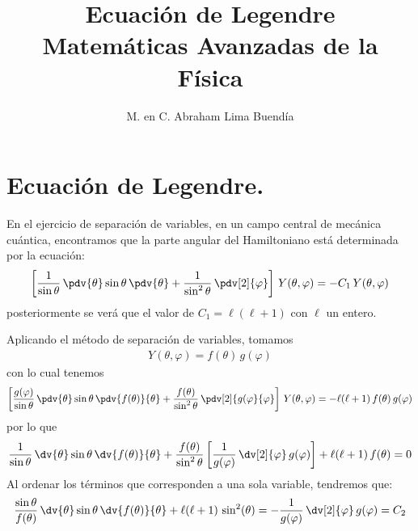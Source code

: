 
\title{Ecuación de Legendre\\ \large{Matemáticas Avanzadas de la Física}\vspace{-3ex}}
\author{M. en C. Abraham Lima Buendía}
\date{ }

\vspace{-4cm}
\maketitle
\fontsize{14}{14}\selectfont
\section{Ecuación de Legendre.}

En el ejercicio de separación de variables, en un campo central de mecánica cuántica, encontramos que la parte angular del Hamiltoniano está determinada por la ecuación:
\begin{align*}
\left[ \dfrac{1}{\sin \theta} \, \pdv{\theta} \sin \theta \, \pdv{\theta} + \dfrac{1}{\sin^{2} \theta} \, \pdv[2]{\varphi}  \right] \, Y (\theta, \varphi) = - C_{1} \, Y(\theta, \varphi)
\end{align*}
posteriormente se verá que el valor de $C_{1} = \ell (\ell +1)$ con $\ell$ un entero.
\par
Aplicando el método de separación de variables, tomamos
\begin{align*}
Y(\theta, \varphi) = f(\theta) \, g(\varphi)
\end{align*}
con lo cual tenemos
\begin{align*}
\left[ \dfrac{g(\varphi)}{\sin \theta} \, \pdv{\theta} \sin \theta \, \pdv{f(\theta)}{\theta} + \dfrac{f(\theta)}{\sin^{2} \theta} \, \pdv[2]{g(\varphi}{\varphi}  \right] \, Y (\theta, \varphi) = -  \ell (\ell + 1)\, f(\theta) \, g(\varphi)
\end{align*}
por lo que
\begin{align*}
\dfrac{1}{\sin \theta} \, \dv{\theta} \sin \theta \, \dv{f(\theta)}{\theta} + \dfrac{f(\theta)}{\sin^{2} \theta} \left[ \dfrac{1}{g(\varphi)} \, \dv[2]{\varphi} \, g(\varphi) \right] + \ell (\ell + 1) \, f(\theta) = 0
\end{align*}
Al ordenar los términos que corresponden a una sola variable, tendremos que:
\begin{align*}
\dfrac{\sin \theta}{f(\theta)} \, \dv{\theta} \sin \theta \, \dv{f(\theta)}{\theta} + \ell (\ell + 1) \, \sin^{2}(\theta) = - \dfrac{1}{g(\varphi)} \, \dv[2]{\varphi} \, g(\varphi) = C_{2} 
\end{align*}

